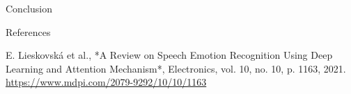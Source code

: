 \documentclass[final]{beamer}
\begin{document}
\begin{frame}[t]
\begin{minipage}[t]{0.28\textwidth}
\begin{block}{Conclusion}
\end{block}

\begin{block}{References}

\vspace{-0.2cm}

\nocite{*}
\footnotesize{
\begin{thebibliography}{9}
     E. Lieskovská et al., *A Review on Speech Emotion Recognition Using Deep Learning and Attention Mechanism*, Electronics, vol. 10, no. 10, p. 1163, 2021.\\
    \url{https://www.mdpi.com/2079-9292/10/10/1163}

\end{thebibliography}
}
\end{block}
\end{minipage}

\end{frame}
\end{document}
